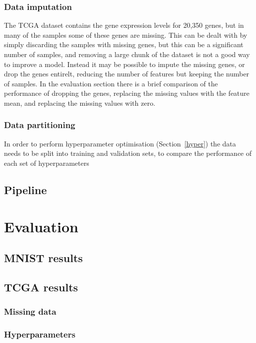 \documentclass[12pt,a4paper,twoside,openright]{report}
\begin{document}
\subsection{Data imputation}

The TCGA dataset contains the gene expression levels for 20,350 genes, but in many of the samples some of these genes are missing.
This can be dealt with by simply discarding the samples with missing genes, but this can be a significant number of samples, and removing 
a large chunk of the dataset is not a good way to improve a model. Instead it may be possible to impute the missing genes, or drop the 
genes entirelt, reducing the number of features but keeping the number of samples. In the evaluation section there is a brief comparison 
of the performance of dropping the genes, replacing the missing values with the feature mean, and replacing the missing values with zero.

\subsection{Data partitioning}

In order to perform hyperparameter optimisation (Section~\ref{hyper}) the data needs to be split into training and validation sets, to 
compare the performance of each set of hyperparameters 

\section{Pipeline}

\chapter{Evaluation}

\section{MNIST results}

\section{TCGA results}

\subsection{Missing data}

\subsection{Hyperparameters}
\end{document}
